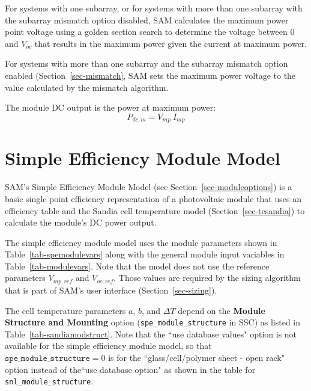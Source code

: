 \documentclass[12pt,letterpaper]{article}
\begin{document}
For systems with one subarray, or for systems with more than one subarray with the subarray mismatch option disabled, SAM calculates the maximum power point voltage using a golden section search to determine the voltage between 0 and $V_{oc}$ that results in the maximum power given the current at maximum power.

For systems with more than one subarray and the subarray mismatch option enabled (Section~\ref{sec-mismatch}, SAM sets the maximum power voltage to the value calculated by the mismatch algorithm.

The module DC output is the power at maximum power:
\begin{equation}
P_{dc,m} = V_{mp}~I_{mp}
\end{equation}

\section{Simple Efficiency Module Model}\label{sec-simplemodule}

SAM's Simple Efficiency Module Model  (see Section~\ref{sec-moduleoptions}) is a basic single point efficiency representation of a photovoltaic module that uses an efficiency table and the Sandia cell temperature model (Section~\ref{sec-tcsandia}) to calculate the module's DC power output.

The simple efficiency module model uses the module parameters shown in Table~\ref{tab-spemodulevars} along with the general module input variables in Table~\ref{tab-modulevars}. Note that the model does not use the reference parameters $V_{mp,ref}$ and $V_{oc,ref}$. Those values are required by the sizing algorithm that is part of SAM's user interface (Section~\ref{sec-sizing}).

The cell temperature parameters $a$, $b$, and $\Delta T$ depend on the \textbf{Module Structure and Mounting} option (\texttt{spe\_module\_structure} in SSC) as listed in Table~\ref{tab-sandiamodstruct}. Note that the ``use database values" option is not available for the simple efficiency module model, so that  $\mathtt{spe\_module\_structure}=0$ is for the ``glass/cell/polymer sheet - open rack" option instead of the``use database option" as shown in the table for \texttt{snl\_module\_structure}.
\end{document}
